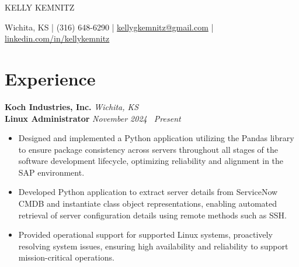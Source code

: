 \documentclass[10pt]{article}       %
\begin{document}
\centerline{\Huge KELLY KEMNITZ}

\vspace{5pt}

\centerline{\large Wichita, KS | (316) 648-6290 | \href{mailto:kellygkemnitz@gmail.com}{kellygkemnitz@gmail.com} | \href{https://www.linkedin.com/in/kellykemnitz/}{linkedin.com/in/kellykemnitz}}

\vspace{-10pt}

\section*{Experience}
\textbf{Koch Industries, Inc.} \hfill \textit{Wichita, KS} \\
\vspace{1pt}
\textbf{Linux Administrator} \hfill \textit{November 2024 \textendash\ Present} \\
\vspace{-6.5pt}
\begin{itemize}
  \item Designed and implemented a Python application utilizing the Pandas library to ensure package consistency across servers throughout all stages of the software development lifecycle, optimizing reliability and alignment in the SAP environment.
  \item Developed Python application to extract server details from ServiceNow CMDB and instantiate class object representations, enabling automated retrieval of server configuration details using remote methods such as SSH.
  \item Provided operational support for supported Linux systems, proactively resolving system issues, ensuring high availability and reliability to support mission-critical operations.
\end{itemize}
\end{document}
